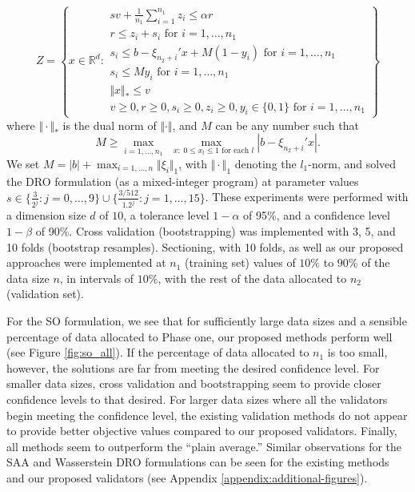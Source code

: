 \documentclass[mnsc,blindrev]{informs4} %
\newcommand{\R}{\mathbb{R}}
\newcommand{\abs}[1]{\left \vert #1 \right\vert}
\begin{document}
\begin{equation*}
Z=\left\{x\in\R^d:\begin{array}{l}
s v+ \frac{1}{n_1}\sum_{i=1}^{n_1}z_i\leq \alpha r\\
r\leq z_i+s_i\text{ for }i=1,\ldots,n_1\\
s_i\leq b-\xi_{n_2+i}'x+M(1-y_i)\text{ for }i=1,\ldots,n_1\\
s_i\leq My_i\text{ for }i=1,\ldots,n_1\\
\Vert x\Vert_*\leq v\\
v\geq 0,r\geq 0, s_i\geq 0,z_i\geq 0,y_i\in\{0,1\}\text{ for }i=1,\ldots,n_1
\end{array}\right\}
\end{equation*}
where $\Vert\cdot \Vert_*$ is the dual norm of $\Vert \cdot \Vert$, and $M$ can be any number such that
$$M\geq \max_{i=1,\ldots,n_1}\max_{\;\;x:\;0\leq x_l\leq 1\text{ for each }l}\abs{b-\xi_{n_2+i}'x}.$$ We set $M=\abs{b} + \max_{i=1,\ldots,n}\Vert \xi_i\Vert_1$, with $\Vert \cdot\Vert_1$ denoting the $l_1$-norm, and solved the DRO formulation (as a mixed-integer program) at parameter values $s\in\{\frac{3}{2^j} : j=0,\ldots,9\}\cup\{\frac{3/512}{1.2^j} : j=1,\ldots,15\}$. These experiments were performed with a dimension size $d$ of $10$, a tolerance level $1 - \alpha$ of 95\%, and a confidence level $1 - \beta$ of 90\%. Cross validation (bootstrapping) was implemented with 3, 5, and 10 folds (bootstrap resamples). Sectioning, with 10 folds, as well as our proposed approaches were implemented at $n_1$ (training set) values of $10\%$ to $90\%$ of the data size $n$, in intervals of $10\%$, with the rest of the data allocated to $n_2$ (validation set).

For the SO formulation, we see that for sufficiently large data sizes and a sensible percentage of data allocated to Phase one, our proposed methods perform well (see Figure \ref{fig:so_all}). If the percentage of data allocated to $n_1$ is too small, however, the solutions are far from meeting the desired confidence level. For smaller data sizes, cross validation and bootstrapping seem to provide closer confidence levels to that desired. For larger data sizes where all the validators begin meeting the confidence level, the existing validation methods do not appear to provide better objective values compared to our proposed validators. Finally, all methods seem to outperform the ``plain average.'' Similar observations for the SAA and Wasserstein DRO formulations can be seen for the existing methods and our proposed validators (see Appendix \ref{appendix:additional-figures}).
\end{document}
